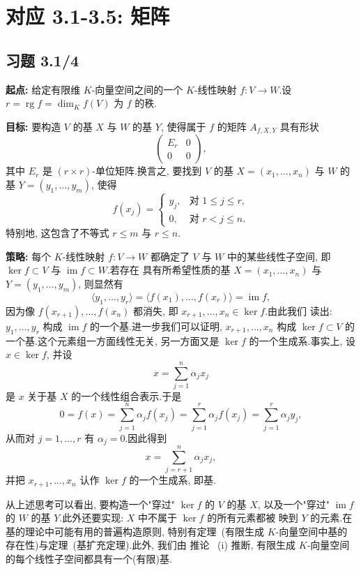 \section*{对应 3.1-3.5: 矩阵}

\subsection*{习题 3.1/4}

\noindent\textbf{起点:} 给定有限维 $K$-向量空间之间的一个 $K$-线性映射
$f \colon V \longrightarrow W$.设 $r = \operatorname{rg} f = \dim_K f(V)$ 为 $f$ 的秩.

\noindent\textbf{目标:} 要构造 $V$ 的基 $X$ 与 $W$ 的基 $Y$, 使得属于 $f$ 的矩阵
$A_{f, X, Y}$ 具有形状
\[
\begin{pmatrix} E_r & 0 \\ 0 & 0 \end{pmatrix},
\]
其中 $E_r$ 是 $(r \times r)$-单位矩阵.换言之, 要找到 $V$ 的基
$X = (x_1, \ldots, x_n)$ 与 $W$ 的基 $Y = (y_1, \ldots, y_m)$, 使得
\[
f(x_j) = \begin{cases} y_j, & \text{对 } 1 \leq j \leq r, \\ 0, & \text{对 } r < j \leq n\text{.} \end{cases}
\]
特别地, 这包含了不等式 $r \leq m$ 与 $r \leq n$.

\noindent\textbf{策略:} 每个 $K$-线性映射 $f \colon V \longrightarrow W$ 都确定了 $V$ 与
$W$ 中的某些线性子空间, 即 $\ker f \subset V$ 与 $\operatorname{im} f \subset W$.若存在
具有所希望性质的基 $X = (x_1, \ldots, x_n)$ 与 $Y = (y_1, \ldots, y_m)$, 则显然有
\[
\langle y_1, \ldots, y_r \rangle = \langle f(x_1), \ldots, f(x_r) \rangle = \operatorname{im} f,
\]
因为像 $f(x_{r+1}), \ldots, f(x_n)$ 都消失, 即 $x_{r+1}, \ldots, x_n \in \ker f$.由此我们
读出: $y_1, \ldots, y_r$ 构成 $\operatorname{im} f$ 的一个基.进一步我们可以证明,
$x_{r+1}, \ldots, x_n$ 构成 $\ker f \subset V$ 的一个基.这个元素组一方面线性无关,
另一方面又是 $\ker f$ 的一个生成系.事实上, 设 $x \in \ker f$, 并设
\[
x = \sum_{j = 1}^{n} \alpha_j x_j
\]
是 $x$ 关于基 $X$ 的一个线性组合表示.于是
\[
0 = f(x) = \sum_{j = 1}^{n} \alpha_j f(x_j) = \sum_{j = 1}^{r} \alpha_j f(x_j) = \sum_{j = 1}^{r} \alpha_j y_j,
\]
从而对 $j = 1, \ldots, r$ 有 $\alpha_j = 0$.因此得到
\[
x = \sum_{j = r + 1}^{n} \alpha_j x_j,
\]
并把 $x_{r+1}, \ldots, x_n$ 认作 $\ker f$ 的一个生成系, 即基.

从上述思考可以看出, 要构造一个"穿过" $\ker f$ 的 $V$ 的基 $X$, 以及一个"穿过"
$\operatorname{im} f$ 的 $W$ 的基 $Y$.此外还要实现: $X$ 中不属于 $\ker f$ 的所有元素都被
映到 $Y$ 的元素.在基的理论中可能有用的普遍构造原则, 特别有定理~(有限生成
$K$-向量空间中基的存在性)与定理~(基扩充定理).此外, 我们由
推论~ (i) 推断, 有限生成 $K$-向量空间的每个线性子空间都具有一个(有限)基.

